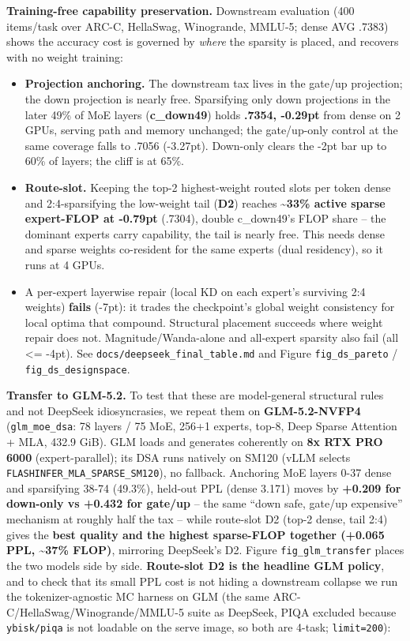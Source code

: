 \documentclass[
]{article}
\providecommand{\tightlist}{%
  \setlength{\itemsep}{0pt}\setlength{\parskip}{0pt}}
\begin{document}
\textbf{Training-free capability preservation.} Downstream evaluation
(400 items/task over ARC-C, HellaSwag, Winogrande, MMLU-5; dense AVG
.7383) shows the accuracy cost is governed by \emph{where} the sparsity
is placed, and recovers with no weight training:

\begin{itemize}
\tightlist
\item
  \textbf{Projection anchoring.} The downstream tax lives in the gate/up
  projection; the down projection is nearly free. Sparsifying only down
  projections in the later 49\% of MoE layers (\textbf{c\_down49}) holds
  \textbf{.7354, -0.29pt} from dense on 2 GPUs, serving path and memory
  unchanged; the gate/up-only control at the same coverage falls to
  .7056 (-3.27pt). Down-only clears the -2pt bar up to 60\% of layers;
  the cliff is at 65\%.
\item
  \textbf{Route-slot.} Keeping the top-2 highest-weight routed slots per
  token dense and 2:4-sparsifying the low-weight tail (\textbf{D2})
  reaches \textbf{\textasciitilde33\% active sparse expert-FLOP at
  -0.79pt} (.7304), double c\_down49's FLOP share -- the dominant
  experts carry capability, the tail is nearly free. This needs dense
  and sparse weights co-resident for the same experts (dual residency),
  so it runs at 4 GPUs.
\item
  A per-expert layerwise repair (local KD on each expert's surviving 2:4
  weights) \textbf{fails} (-7pt): it trades the checkpoint's global
  weight consistency for local optima that compound. Structural
  placement succeeds where weight repair does not. Magnitude/Wanda-alone
  and all-expert sparsity also fail (all \textless= -4pt). See
  \texttt{docs/deepseek\_final\_table.md} and Figure
  \texttt{fig\_ds\_pareto} / \texttt{fig\_ds\_designspace}.
\end{itemize}

\textbf{Transfer to GLM-5.2.} To test that these are model-general
structural rules and not DeepSeek idiosyncrasies, we repeat them on
\textbf{GLM-5.2-NVFP4} (\texttt{glm\_moe\_dsa}: 78 layers / 75 MoE,
256+1 experts, top-8, Deep Sparse Attention + MLA, 432.9 GiB). GLM loads
and generates coherently on \textbf{8x RTX PRO 6000} (expert-parallel);
its DSA runs natively on SM120 (vLLM selects
\texttt{FLASHINFER\_MLA\_SPARSE\_SM120}), no fallback. Anchoring MoE
layers 0-37 dense and sparsifying 38-74 (49.3\%), held-out PPL (dense
3.171) moves by \textbf{+0.209 for down-only vs +0.432 for gate/up} --
the same ``down safe, gate/up expensive'' mechanism at roughly half the
tax -- while route-slot D2 (top-2 dense, tail 2:4) gives the
\textbf{best quality and the highest sparse-FLOP together (+0.065 PPL,
\textasciitilde37\% FLOP)}, mirroring DeepSeek's D2. Figure
\texttt{fig\_glm\_transfer} places the two models side by side.
\textbf{Route-slot D2 is the headline GLM policy}, and to check that its
small PPL cost is not hiding a downstream collapse we run the
tokenizer-agnostic MC harness on GLM (the same
ARC-C/HellaSwag/Winogrande/MMLU-5 suite as DeepSeek, PIQA excluded
because \texttt{ybisk/piqa} is not loadable on the serve image, so both
are 4-task; \texttt{limit=200}):
\end{document}
